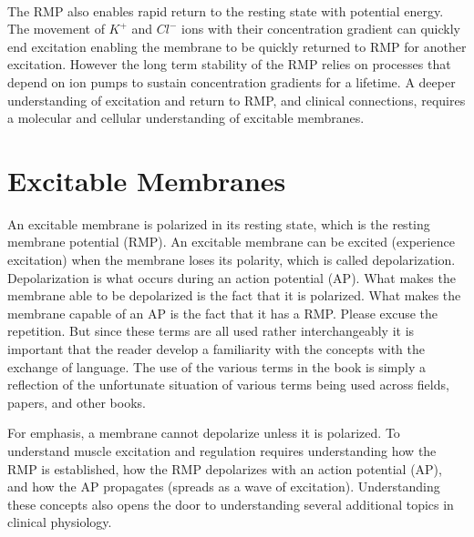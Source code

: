 \paragraph{}
The RMP also enables rapid return to the resting state with potential energy. The movement of $K^+$ and $Cl^-$ ions with their concentration gradient can quickly end excitation enabling the membrane to be quickly returned to RMP for another excitation. However the long term stability of the RMP relies on processes that depend on ion pumps to sustain concentration gradients for a lifetime.\footnotemark{}
A deeper understanding of excitation and return to RMP, and clinical connections, requires a molecular and cellular understanding of excitable membranes.


\section{Excitable Membranes}

An excitable membrane is polarized in its resting state, which is the resting membrane potential (RMP). An excitable membrane can be excited (experience excitation) when the membrane loses its polarity, which is called depolarization. Depolarization is what occurs during an action potential (AP). What makes the membrane able to be depolarized is the fact that it is polarized. What makes the membrane capable of an AP is the fact that it has a RMP. Please excuse the repetition. But since these terms are all used rather interchangeably it is important that the reader develop a familiarity with the concepts with the exchange of language. The use of the various terms in the book is simply a reflection of the unfortunate situation of various terms being used across fields, papers, and other books.

For emphasis, a membrane cannot depolarize unless it is polarized. To understand muscle excitation and regulation\footnotemark{} requires understanding how the RMP is established, how the RMP depolarizes with an action potential (AP), and how the AP propagates (spreads as a wave of excitation). Understanding these concepts also opens the door to understanding several additional topics in clinical physiology. 



